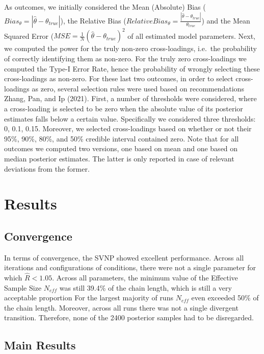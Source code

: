 \documentclass[
  english,
  man]{apa6}
\begin{document}
As outcomes, we initially considered the Mean (Absolute) Bias (\(Bias_{\theta} = |\hat{\theta} - \theta_{true} |\)), the Relative Bias (\(RelativeBias_{\theta} = \frac{|\hat{\theta} - \theta_{true} |}{\theta_{true}}\)) and the Mean Squared Error (\(MSE = \frac{1}{N}(\hat{\theta} - \theta_{true})^2\) of all estimated model parameters. Next, we computed the power for the truly non-zero cross-loadings, i.e.~the probability of correctly identifying them as non-zero. For the truly zero cross-loadings we computed the Type-I Error Rate, hence the probability of wrongly selecting these cross-loadings as non-zero. For these last two outcomes, in order to select cross-loadings as zero, several selection rules were used based on recommendations Zhang, Pan, and Ip (2021). First, a number of thresholds were considered, where a cross-loading is selected to be zero when the absolute value of its posterior estimates falls below a certain value. Specifically we considered three thresholds: 0, 0.1, 0.15. Moreover, we selected cross-loadings based on whether or not their 95\%, 90\%, 80\%, and 50\% credible interval contained zero. Note that for all outcomes we computed two versions, one based on mean and one based on median posterior estimates. The latter is only reported in case of relevant deviations from the former.

\hypertarget{results}{%
\section{Results}\label{results}}

\hypertarget{convergence}{%
\subsection{Convergence}\label{convergence}}

In terms of convergence, the SVNP showed excellent performance. Across all iterations and configurations of conditions, there were not a single parameter for which \(\hat{R} < 1.05\). Across all parameters, the minimum value of the Effective Sample Size \(N_{eff}\) was still 39.4\% of the chain length, which is still a very acceptable proportion For the largest majority of runs \(N_{eff}\) even exceeded 50\% of the chain length. Moreover, across all runs there was not a single divergent transition. Therefore, none of the 2400 posterior samples had to be disregarded.

\hypertarget{main-results}{%
\subsection{Main Results}\label{main-results}}
\end{document}
